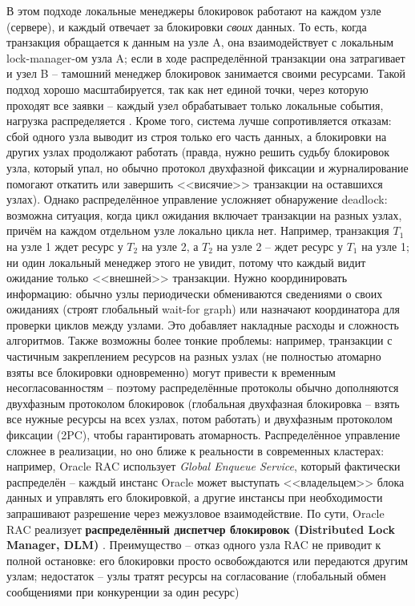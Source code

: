 \begin{itemize}
    В этом подходе локальные менеджеры блокировок работают на каждом узле (сервере), и каждый отвечает за блокировки \textit{своих} данных. То есть, когда транзакция обращается к данным на узле A, она взаимодействует с локальным lock-manager-ом узла A; если в ходе распределённой транзакции она затрагивает и узел B – тамошний менеджер блокировок занимается своими ресурсами. Такой подход хорошо масштабируется, так как нет единой точки, через которую проходят все заявки – каждый узел обрабатывает только локальные события, нагрузка распределяется \autocite{Silberschatz}. Кроме того, система лучше сопротивляется отказам: сбой одного узла выводит из строя только его часть данных, а блокировки на других узлах продолжают работать (правда, нужно решить судьбу блокировок узла, который упал, но обычно протокол двухфазной фиксации и журналирование помогают откатить или завершить <<висячие>> транзакции на оставшихся узлах). Однако распределённое управление усложняет обнаружение deadlock: возможна ситуация, когда цикл ожидания включает транзакции на разных узлах, причём на каждом отдельном узле локально цикла нет. Например, транзакция $T_1$ на узле 1 ждет ресурс у $T_2$ на узле 2, а $T_2$ на узле 2 – ждет ресурс у $T_1$ на узле 1; ни один локальный менеджер этого не увидит, потому что каждый видит ожидание только <<внешней>> транзакции. Нужно координировать информацию: обычно узлы периодически обмениваются сведениями о своих ожиданиях (строят глобальный wait-for graph) или назначают координатора для проверки циклов между узлами. Это добавляет накладные расходы и сложность алгоритмов. Также возможны более тонкие проблемы: например, транзакции с частичным закреплением ресурсов на разных узлах (не полностью атомарно взяты все блокировки одновременно) могут привести к временным несогласованностям – поэтому распределённые протоколы обычно дополняются двухфазным протоколом блокировок (глобальная двухфазная блокировка – взять все нужные ресурсы на всех узлах, потом работать) и двухфазным протоколом фиксации (2PC), чтобы гарантировать атомарность. Распределённое управление сложнее в реализации, но оно ближе к реальности в современных кластерах: например, Oracle RAC использует \textit{Global Enqueue Service}, который фактически распределён – каждый инстанс Oracle может выступать <<владельцем>> блока данных и управлять его блокировкой, а другие инстансы при необходимости запрашивают разрешение через межузловое взаимодействие. По сути, Oracle RAC реализует \textbf{распределённый диспетчер блокировок (Distributed Lock Manager, DLM)} \autocite{oracleessentialsc7}. Преимущество – отказ одного узла RAC не приводит к полной остановке: его блокировки просто освобождаются или передаются другим узлам; недостаток – узлы тратят ресурсы на согласование (глобальный обмен сообщениями при конкуренции за один ресурс)
 \end{itemize} 
 
